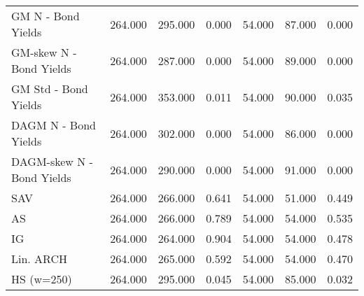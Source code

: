 \documentclass{article}
\begin{document}
\begin{table}[ht]
\begin{tabular}{|l|lll|lll|}
  GM N - Bond Yields & 264.000 & 295.000 & 0.000 & 54.000 & 87.000 & 0.000 \\
  GM-skew N - Bond Yields & 264.000 & 287.000 & 0.000  & 54.000 & 89.000 & 0.000 \\
  GM Std - Bond Yields & 264.000 & 353.000 & 0.011  & 54.000 & 90.000 & 0.035 \\
  DAGM N - Bond Yields & 264.000 & 302.000 & 0.000 & 54.000 & 86.000 & 0.000 \\
  DAGM-skew N - Bond Yields & 264.000 & 290.000 & 0.000  & 54.000 & 91.000 & 0.000 \\
  \hline
  SAV & 264.000 & 266.000 & 0.641  & 54.000 & 51.000 & 0.449 \\
  AS & 264.000 & 266.000 & 0.789  & 54.000 & 54.000 & 0.535 \\ 
  IG & 264.000 & 264.000 & 0.904  & 54.000 & 54.000 & 0.478 \\ 
  Lin. ARCH & 264.000 & 265.000 & 0.592  & 54.000 & 54.000 & 0.470 \\
  \hline
  HS (w=250) & 264.000 & 295.000 & 0.045 & 54.000 & 85.000 & 0.032 \\ 
   \hline
\end{tabular}
\end{table}
\end{document}
